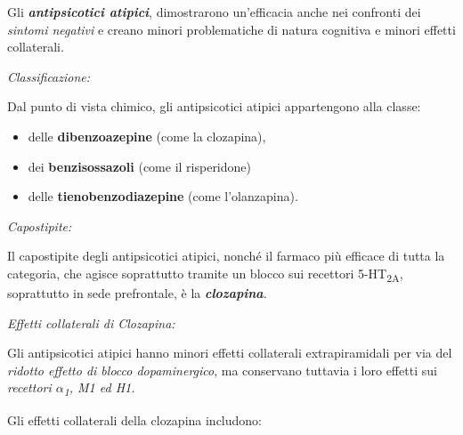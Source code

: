 Gli \textbf{\emph{antipsicotici atipici}}, dimostrarono un'efficacia
anche nei confronti dei \emph{sintomi negativi} e creano minori
problematiche di natura cognitiva e minori effetti collaterali.

\emph{\emph{Classificazione: }}

Dal punto di vista chimico, gli antipsicotici atipici appartengono alla
classe:

\begin{itemize}
\item
  delle \textbf{dibenzoazepine} (come la clozapina),
\item
  dei \textbf{benzisossazoli} (come il risperidone)
\item
  delle \textbf{tienobenzodiazepine} (come l'olanzapina).
\end{itemize}

\emph{\emph{Capostipite:}}

Il capostipite degli antipsicotici atipici, nonché il farmaco più
efficace di tutta la categoria, che agisce soprattutto tramite un blocco
sui recettori 5-HT\textsubscript{2A}, soprattutto in sede prefrontale, è
la \textbf{\emph{clozapina}}.

\emph{\emph{Effetti collaterali di Clozapina:}}

Gli antipsicotici atipici hanno minori effetti collaterali
extrapiramidali per via del \emph{ridotto effetto di blocco
dopaminergico}, ma conservano tuttavia i loro effetti sui
\emph{recettori $\alpha$\textsubscript{1}, M1 ed H1.}

Gli effetti collaterali della clozapina includono:

